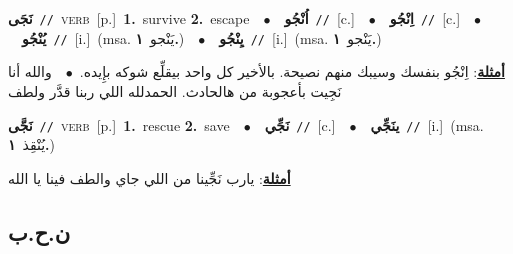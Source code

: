 \documentclass[10pt,a4paper,twoside]{article} %
\begin{document}
\begin{multicols}{2}
{\setlength\topsep{0pt}\textbf{\foreignlanguage{arabic}{نَجَى}}\ {\color{gray}\texttt{//}\color{black}}\ \textsc{verb}\ [p.]\ \textbf{1.}~survive  \textbf{2.}~escape\ \ $\bullet$\ \ \setlength\topsep{0pt}\textbf{\foreignlanguage{arabic}{اُنْجُو}}\ {\color{gray}\texttt{//}\color{black}}\ [c.]\ \ $\bullet$\ \ \setlength\topsep{0pt}\textbf{\foreignlanguage{arabic}{اِنْجُو}}\ {\color{gray}\texttt{//}\color{black}}\ [c.]\ \ $\bullet$\ \ \setlength\topsep{0pt}\textbf{\foreignlanguage{arabic}{يُنْجُو}}\ {\color{gray}\texttt{//}\color{black}}\ [i.]\ \color{gray}(msa. \foreignlanguage{arabic}{يَنْجو}~\foreignlanguage{arabic}{\textbf{١.}})\color{black}\ \ $\bullet$\ \ \setlength\topsep{0pt}\textbf{\foreignlanguage{arabic}{يِنْجُو}}\ {\color{gray}\texttt{//}\color{black}}\ [i.]\ \color{gray}(msa. \foreignlanguage{arabic}{يَنْجو}~\foreignlanguage{arabic}{\textbf{١.}})\color{black}\  \begin{flushright}\color{gray}\foreignlanguage{arabic}{\textbf{\underline{\foreignlanguage{arabic}{أمثلة}}}: اِنْجُو بنفسك وسيبك منهم نصيحة. بالأخير كل واحد بيقلِّع شوكه بإِيده.\ $\bullet$\ \  والله أنا نَجِيت بأعجوبة من هالحادث. الحمدلله اللي ربنا قدَّر ولطف}\end{flushright}\color{black}} \vspace{2mm}

{\setlength\topsep{0pt}\textbf{\foreignlanguage{arabic}{نَجَّى}}\ {\color{gray}\texttt{//}\color{black}}\ \textsc{verb}\ [p.]\ \textbf{1.}~rescue  \textbf{2.}~save\ \ $\bullet$\ \ \setlength\topsep{0pt}\textbf{\foreignlanguage{arabic}{نَجِّي}}\ {\color{gray}\texttt{//}\color{black}}\ [c.]\ \ $\bullet$\ \ \setlength\topsep{0pt}\textbf{\foreignlanguage{arabic}{ينَجِّي}}\ {\color{gray}\texttt{//}\color{black}}\ [i.]\ \color{gray}(msa. \foreignlanguage{arabic}{يُنْقِذ}~\foreignlanguage{arabic}{\textbf{١.}})\color{black}\  \begin{flushright}\color{gray}\foreignlanguage{arabic}{\textbf{\underline{\foreignlanguage{arabic}{أمثلة}}}: يارب نَجِّينا من اللي جاي والطف فينا يا الله}\end{flushright}\color{black}} \vspace{2mm}

\vspace{-3mm}
\subsection*{\color{blue}\foreignlanguage{arabic}{ن.ح.ب}\color{blue}{}} 


\end{multicols}
\end{document}
